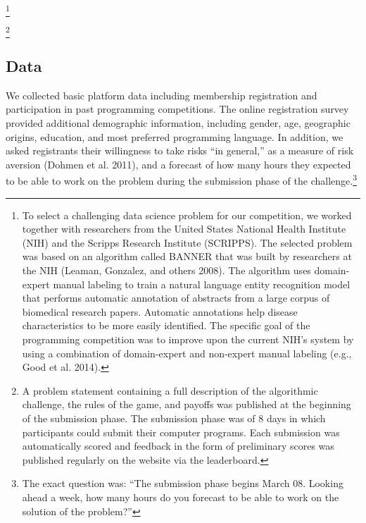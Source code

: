 \documentclass[11pt, titlepage]{article}
\begin{document}
\footnote{To select a challenging data science problem for our
  competition, we worked together with researchers from the United
  States National Health Institute (NIH) and the Scripps Research
  Institute (SCRIPPS). The selected problem was based on an algorithm
  called BANNER that was built by researchers at the NIH (Leaman,
  Gonzalez, and others 2008). The algorithm uses domain-expert manual
  labeling to train a natural language entity recognition model that
  performs automatic annotation of abstracts from a large corpus of
  biomedical research papers. Automatic annotations help disease
  characteristics to be more easily identified. The specific goal of the
  programming competition was to improve upon the current NIH's system
  by using a combination of domain-expert and non-expert manual labeling
  (e.g., Good et al. 2014).}

\footnote{A problem statement containing a full description of the
  algorithmic challenge, the rules of the game, and payoffs was
  published at the beginning of the submission phase. The submission
  phase was of 8 days in which participants could submit their computer
  programs. Each submission was automatically scored and feedback in the
  form of preliminary scores was published regularly on the website via
  the leaderboard.}

\subsection{Data}\label{data}

We collected basic platform data including membership registration and
participation in past programming competitions. The online registration
survey provided additional demographic information, including gender,
age, geographic origins, education, and most preferred programming
language. In addition, we asked registrants their willingness to take
risks ``in general,'' as a measure of risk aversion (Dohmen et al.
2011), and a forecast of how many hours they expected to be able to work
on the problem during the submission phase of the challenge.\footnote{The
  exact question was: ``The submission phase begins March 08. Looking
  ahead a week, how many hours do you forecast to be able to work on the
  solution of the problem?''}
\end{document}
